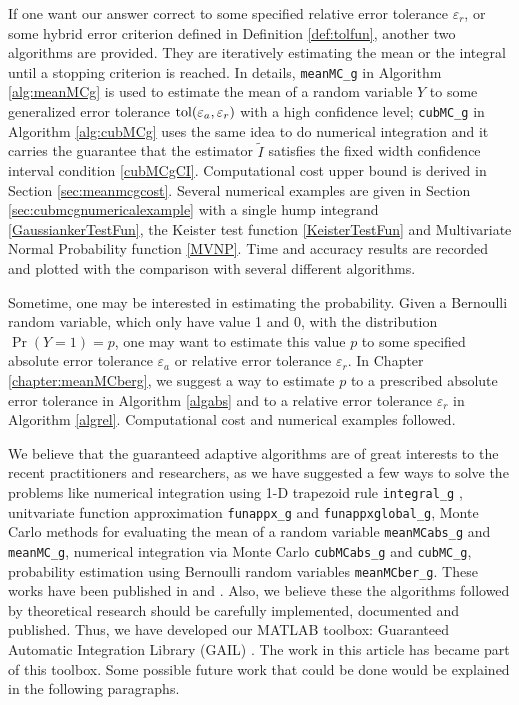 \documentclass{iitthesis}
\theoremstyle{definition}
\begin{document}
If one want our answer correct to some specified relative error tolerance $\varepsilon_r$, or some hybrid error criterion defined in Definition \ref{def:tolfun}, another two algorithms are provided. They are iteratively estimating the mean or the integral until a stopping criterion is reached. In details, {\tt meanMC\_g} in Algorithm \ref{alg:meanMCg} is used to estimate the mean of a random variable $Y$ to some generalized error tolerance $\operatorname{tol}(\varepsilon_a, \varepsilon_r)$ with a high confidence level; {\tt cubMC\_g} in Algorithm \ref{alg:cubMCg} uses the same idea to do numerical integration and it carries the guarantee that the estimator $\tilde{I}$ satisfies the fixed width confidence interval condition \eqref{cubMCgCI}. Computational cost upper bound is derived in Section \ref{sec:meanmcgcost}. Several numerical examples are given in Section \ref{sec:cubmcgnumericalexample} with a single hump integrand \eqref{GaussiankerTestFun}, the Keister test function \eqref{KeisterTestFun} and Multivariate Normal Probability function \eqref{MVNP}. Time and accuracy results are recorded and plotted with the comparison with several different algorithms.

Sometime, one may be interested in estimating the probability. Given a Bernoulli random variable, which only have value 1 and 0, with the distribution $\Pr(Y =1) = p$, one may want to estimate this value $p$ to some specified absolute error tolerance $\varepsilon_a$ or relative error tolerance $\varepsilon_r$. In Chapter \ref{chapter:meanMCberg}, we suggest a way to estimate $p$ to a prescribed absolute error tolerance in Algorithm \ref{algabs} and to a relative error tolerance $\varepsilon_r$ in Algorithm \ref{algrel}. Computational cost and numerical examples followed.


\label{chapter: future work}

We believe that the guaranteed adaptive algorithms are of great interests to the recent practitioners and researchers, as we have suggested a few ways to solve the problems like numerical integration using 1-D trapezoid rule {\tt integral\_g} , unitvariate function approximation {\tt funappx\_g} and {\tt funappxglobal\_g}, Monte Carlo methods for evaluating the mean of a random variable {\tt meanMCabs\_g} and {\tt meanMC\_g}, numerical integration via Monte Carlo {\tt cubMCabs\_g} and {\tt cubMC\_g}, probability estimation using Bernoulli random variables {\tt meanMCber\_g}. These works have been published in \cite{CDHHZ13} and \cite{HJLO12}. Also, we believe these the algorithms followed by theoretical research should be carefully implemented, documented and published. Thus, we have developed our MATLAB toolbox: Guaranteed Automatic Integration Library (GAIL) \cite{GAIL_2_1}. The work in this article has became part of this toolbox. Some possible future work that could be done would be explained in the following paragraphs.
\end{document}
